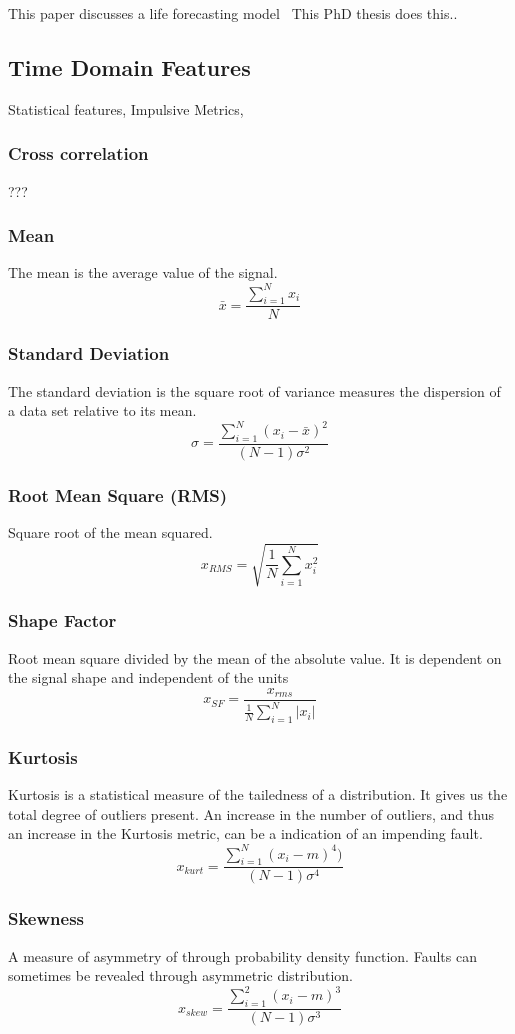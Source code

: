\documentclass{article}
\begin{document}
This paper discusses a life forecasting model~\cite{wang2016multiple}
This PhD thesis does this..~\cite{martin2017unsupervised}

\subsection{Time Domain Features} 	
Statistical features, Impulsive Metrics, 
\subsubsection{Cross correlation}
???
\subsubsection{Mean}
The mean is the average value of the signal.
$$ \bar{x} = \frac{\sum^N_{i=1} x_i}{N} $$
\subsubsection{Standard Deviation}  
The standard deviation is the square root of variance measures the dispersion of a data set relative to its mean. 
$$ \sigma =\frac{\sum^N_{i=1}(x_i-\bar{x})^2}{(N-1)\sigma^2} $$
\subsubsection{Root Mean Square (RMS)}
Square root of the mean squared.
$$ x_{RMS} = \sqrt{\frac{1}{N} \sum^N_{i=1}x^2_i} $$
\subsubsection{Shape Factor}
Root mean square divided by the mean of the absolute value. It is dependent on the signal shape and independent of the units
$$ x_{SF} = \frac{ x_{rms} }  {\frac{1}{N}\sum^N_{i=1}|x_i|} $$
\subsubsection{Kurtosis}
Kurtosis is a statistical measure of the tailedness of a distribution. It gives us the total degree of outliers present. An increase in the number of outliers, and thus an increase in the Kurtosis metric, can be a indication of an impending fault.
$$ x_{kurt} = \frac{\sum^N_{i=1}(x_i-m)^4)}{(N-1)\sigma^4} $$ 
\subsubsection{Skewness} 
A measure of asymmetry of through probability density function. Faults can sometimes be revealed through asymmetric distribution.
$$ x_{skew} = \frac{\sum^2_{i=1}(x_i-m)^3}{(N-1)\sigma^3} $$
\end{document}
